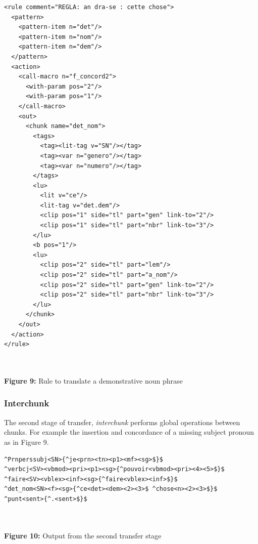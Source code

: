 \documentclass[a0,landscape]{a0poster}
\begin{document}
\begin{multicols}{4}
\begin{center}
\begin{minipage}[b]{25cm}
\begin{small}
\begin{verbatim}
<rule comment="REGLA: an dra-se : cette chose">
  <pattern>
    <pattern-item n="det"/>
    <pattern-item n="nom"/>
    <pattern-item n="dem"/>
  </pattern>
  <action>
    <call-macro n="f_concord2">
      <with-param pos="2"/>
      <with-param pos="1"/>
    </call-macro>
    <out>
      <chunk name="det_nom">
        <tags>
          <tag><lit-tag v="SN"/></tag>
          <tag><var n="genero"/></tag>
          <tag><var n="numero"/></tag>
        </tags>
        <lu>
          <lit v="ce"/>
          <lit-tag v="det.dem"/>
          <clip pos="1" side="tl" part="gen" link-to="2"/>
          <clip pos="1" side="tl" part="nbr" link-to="3"/>
        </lu>
        <b pos="1"/>
        <lu>
          <clip pos="2" side="tl" part="lem"/>
          <clip pos="2" side="tl" part="a_nom"/>
          <clip pos="2" side="tl" part="gen" link-to="2"/>
          <clip pos="2" side="tl" part="nbr" link-to="3"/>
        </lu>
      </chunk>
    </out>
  </action>
</rule>
\end{verbatim}
\end{small}
\end{minipage}\\
~\\
\textbf{Figure 9:} Rule to translate a demonstrative noun phrase
\vspace{0.5cm}
\end{center}
\vspace{0.2cm}

\subsubsection{Interchunk}

\noindent
The second stage of transfer, \emph{interchunk} performs global operations between chunks. For example
the insertion and concordance of a missing subject pronoun as in Figure 9.\\

\begin{center}
\begin{minipage}[b]{26cm}
\begin{small}
\begin{verbatim}
^Prnperssubj<SN>{^je<prn><tn><p1><mf><sg>$}$ 
^verbcj<SV><vbmod><pri><p1><sg>{^pouvoir<vbmod><pri><4><5>$}$ 
^faire<SV><vblex><inf><sg>{^faire<vblex><inf>$}$ 
^det_nom<SN><f><sg>{^ce<det><dem><2><3>$ ^chose<n><2><3>$}$
^punt<sent>{^.<sent>$}$
\end{verbatim}
\end{small}
\end{minipage}\\
~\\
\textbf{Figure 10:} Output from the second transfer stage
\end{center}


\end{multicols}
\end{document}
